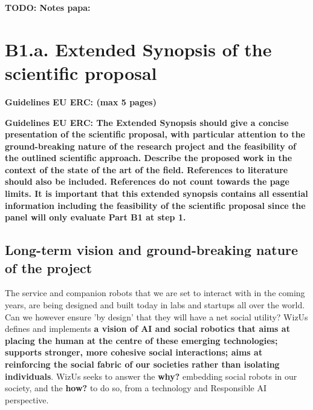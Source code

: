 \documentclass[11pt,a4paper]{report}
\newcommand{\project}{WizUs\xspace}
\newcommand{\TODO}[1]{{\color{red}\textbf{TODO: #1}}}
\newcommand{\eu}[1]{{\color{teal}\textbf{Guidelines EU ERC: #1}}}
\begin{document}
\TODO{Notes papa:}


\chapter{B1.a. Extended Synopsis of the scientific proposal}\label{part1}

\eu{(max 5 pages)}

\eu{The Extended Synopsis should give a concise presentation of the scientific
proposal, with particular attention to the ground-breaking nature of the
research project and the feasibility of the outlined scientific approach.
Describe the proposed work in the context of the state of the art of the field.
References to literature should also be included. References do not count
towards the page limits. It is important that this extended synopsis contains
all essential information including the feasibility of the scientific proposal
since the panel will only evaluate Part B1 at step 1.}

\section{Long-term vision and ground-breaking nature of the project}

The service and companion robots that we are set to interact with in the coming
years, are being designed and built today in labs and startups all over the
world. Can we however ensure 'by design' that they will have a net social utility?
\project defines and implements \textbf{a vision of AI
and social robotics that aims at placing the human at the centre of these
emerging technologies; supports stronger, more cohesive social interactions;
aims at reinforcing the social fabric of our societies rather than isolating
individuals}. \project seeks to answer the \textbf{why?} embedding social robots
in our society, and the \textbf{how?} to do so, from a technology and
Responsible AI perspective.
\end{document}
